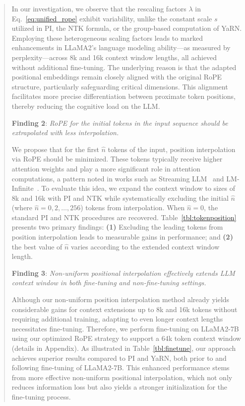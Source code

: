 \begin{abstract}
In our investigation, we observe that the rescaling factors $\lambda$ in Eq.~\ref{eq:unified_rope} exhibit variability, unlike the constant scale $s$ utilized in PI, the NTK formula, or the group-based computation of YaRN. Employing these heterogeneous scaling factors leads to marked enhancements in LLaMA2's language modeling ability—as measured by perplexity—across 8k and 16k context window lengths, all achieved without additional fine-tuning. The underlying reason is that the adapted positional embeddings remain closely aligned with the original RoPE structure, particularly safeguarding critical dimensions. This alignment facilitates more precise differentiation between proximate token positions, thereby reducing the cognitive load on the LLM.

\textbf{Finding 2}: \textit{RoPE for the initial tokens in the input sequence should be extrapolated with less interpolation.} 

We propose that for the first $\hat{n}$ tokens of the input, position interpolation via RoPE should be minimized. These tokens typically receive higher attention weights and play a more significant role in attention computations, a pattern noted in works such as Streaming LLM~\cite{streamingllm} and LM-Infinite~\cite{han2023lminfinite}. To evaluate this idea, we expand the context window to sizes of 8k and 16k with PI and NTK while systematically excluding the initial $\hat n$ (where $\hat n=0,2,\ldots,256$) tokens from interpolation. When $\hat n = 0$, the standard PI and NTK procedures are recovered. Table~\ref{tbl:tokenposition} presents two primary findings: \textbf{(1)} Excluding the leading tokens from position interpolation leads to measurable gains in performance; and \textbf{(2)} the best value of $\hat n$ varies according to the extended context window length.

\textbf{Finding 3}: \textit{Non-uniform positional interpolation effectively extends LLM context window in both fine-tuning and non-fine-tuning settings.} 

Although our non-uniform position interpolation method already yields considerable gains for context extensions up to 8k and 16k tokens without requiring additional training, adapting to even longer context lengths necessitates fine-tuning. Therefore, we perform fine-tuning on LLaMA2-7B using our optimized RoPE strategy to support a 64k token context window (details in Appendix). As illustrated in Table~\ref{tbl:finetune}, our approach achieves superior results compared to PI and YaRN, both prior to and following fine-tuning of LLaMA2-7B. This enhanced performance stems from more effective non-uniform positional interpolation, which not only reduces information loss but also yields a stronger initialization for the fine-tuning process.


\end{abstract}

